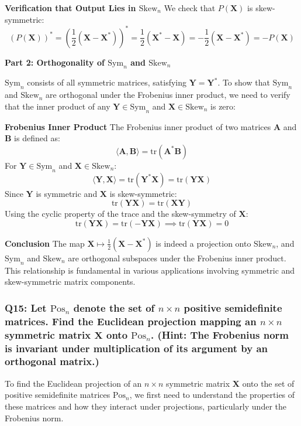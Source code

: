 \documentclass[8pt]{article}
\begin{document}
\textbf{Verification that Output Lies in \(\mathrm{Skew}_n\)}
We check that \(P(\mathbf{X})\) is skew-symmetric:
\[
(P(\mathbf{X}))^* = \left(\frac{1}{2} (\mathbf{X} - \mathbf{X}^*)\right)^* = \frac{1}{2} (\mathbf{X}^* - \mathbf{X}) = -\frac{1}{2} (\mathbf{X} - \mathbf{X}^*) = -P(\mathbf{X})
\]

\textbf{Part 2: Orthogonality of \(\mathrm{Sym}_n\) and \(\mathrm{Skew}_n\)}

\(\mathrm{Sym}_n\) consists of all symmetric matrices, satisfying \(\mathbf{Y} = \mathbf{Y}^*\). To show that \(\mathrm{Sym}_n\) and \(\mathrm{Skew}_n\) are orthogonal under the Frobenius inner product, we need to verify that the inner product of any \(\mathbf{Y} \in \mathrm{Sym}_n\) and \(\mathbf{X} \in \mathrm{Skew}_n\) is zero:

\textbf{Frobenius Inner Product}
The Frobenius inner product of two matrices \(\mathbf{A}\) and \(\mathbf{B}\) is defined as:
\[
\langle \mathbf{A}, \mathbf{B} \rangle = \mathrm{tr}(\mathbf{A}^* \mathbf{B})
\]
For \(\mathbf{Y} \in \mathrm{Sym}_n\) and \(\mathbf{X} \in \mathrm{Skew}_n\):
\[
\langle \mathbf{Y}, \mathbf{X} \rangle = \mathrm{tr}(\mathbf{Y}^* \mathbf{X}) = \mathrm{tr}(\mathbf{Y} \mathbf{X})
\]
Since \(\mathbf{Y}\) is symmetric and \(\mathbf{X}\) is skew-symmetric:
\[
\mathrm{tr}(\mathbf{Y} \mathbf{X}) = \mathrm{tr}(\mathbf{X} \mathbf{Y})
\]
Using the cyclic property of the trace and the skew-symmetry of \(\mathbf{X}\):
\[
\mathrm{tr}(\mathbf{Y} \mathbf{X}) = \mathrm{tr}(-\mathbf{Y} \mathbf{X}) \implies \mathrm{tr}(\mathbf{Y} \mathbf{X}) = 0
\]

\textbf{Conclusion}
The map \(\mathbf{X} \mapsto \frac{1}{2} (\mathbf{X} - \mathbf{X}^*)\) is indeed a projection onto \(\mathrm{Skew}_n\), and \(\mathrm{Sym}_n\) and \(\mathrm{Skew}_n\) are orthogonal subspaces under the Frobenius inner product. This relationship is fundamental in various applications involving symmetric and skew-symmetric matrix components.

\subsubsection*{Q15: Let \(\mathrm{Pos}_n\) denote the set of \(n \times n\) positive semidefinite matrices. Find the Euclidean projection mapping an \(n \times n\) symmetric matrix \(\mathbf{X}\) onto \(\mathrm{Pos}_n\). (Hint: The Frobenius norm is invariant under multiplication of its argument by an orthogonal matrix.)}

To find the Euclidean projection of an \(n \times n\) symmetric matrix \(\mathbf{X}\) onto the set of positive semidefinite matrices \(\mathrm{Pos}_n\), we first need to understand the properties of these matrices and how they interact under projections, particularly under the Frobenius norm. 
\end{document}
